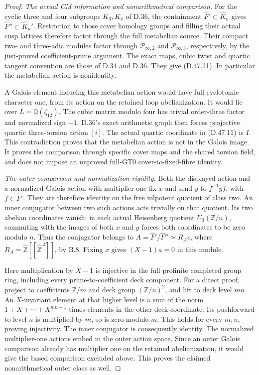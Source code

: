 \begin{proof}
\emph{The actual CM information and nonarithmetical comparison.}
For the cyclic
three and four
subgroups \(K_3,K_4\)
of D.36, the
containment
\(\widehat F'\subset
\widehat K_n\)
gives
\(\widehat F''\subset
\widehat K_n'\).
Restriction to those
cover homology groups
and filling their
actual cusp lattices
therefore factor
through the full
metabelian source.
Their compact
two- and three-adic
modules factor
through
\(\mathcal P_{\infty,2}\)
and
\(\mathcal P_{\infty,3}\),
respectively, by
the just-proved
coefficient-prime
argument.
The exact maps,
cubic twist and
quartic tangent
convention are
those of D.34
and D.36. They
give (D.47.11).
In particular the
metabelian action
is nonidentity.

A Galois element
inducing this
metabelian action
would have full
cyclotomic character
one, from its
action on the
retained loop
abelianization.
It would lie
over
\(L=\mathbb Q(\zeta_{12})\).
The cubic matrix
modulo four has
trivial order-three
factor and
normalized sign
\(-1\).
D.36's exact
arithmetic graph
then forces
projective quartic
three-torsion
action \([i]\).
The actual
quartic coordinate
in (D.47.11)
is \(I\).
This contradiction
proves that the
metabelian action
is not in the
Galois image.
It proves the
comparison through
specific cover
maps and the
shared torsion
field, and does
not impose an
unproved full-GT0
cover-to-fixed-fibre
identity.

\emph{The outer comparison and normalization rigidity.}
Both the displayed
action and a
normalized Galois
action with multiplier
one fix \(x\) and
send \(y\) to
\(f^{-1}yf\), with
\(f\in\widehat F'\).
They are therefore
identity on the
free nilpotent
quotient of class
two. An inner
conjugator between
two such actions
acts trivially on
that quotient.
Its two abelian
coordinates vanish:
in each actual
Heisenberg quotient
\(U_3(\mathbb Z/n)\),
commuting with the
images of both
\(x\) and \(y\)
forces both coordinates
to be zero modulo
\(n\). Thus the
conjugator belongs
to
\(A=\widehat F'/\widehat F''
\simeq R_Ac\), where
\(R_A=\widehat{\mathbb Z}
[[\widehat{\mathbb Z}^{\,2}]]\),
by B.8. Fixing
\(x\) gives
\((X-1)a=0\)
in this module.

Here multiplication
by \(X-1\) is
injective in the
full profinite
completed group ring,
including every
prime-to-coefficient
deck component.
For a direct proof,
project to coefficients
\(\mathbb Z/m\) and
deck group
\((\mathbb Z/n)^2\),
and lift to deck
level \(mn\).
An \(X\)-invariant
element at that
higher level is
a sum of the
norm
\(1+X+\cdots+X^{mn-1}\)
times elements in
the other deck
coordinate. Its
pushforward to
level \(n\) is
multiplied by \(m\),
so is zero modulo
\(m\). This holds
for every \(m,n\),
proving injectivity.
The inner conjugator
is consequently
identity. The
normalized multiplier-one
actions embed in
the outer action
space. Since an
outer Galois comparison
already has multiplier
one on the retained
abelianization, it
would give the
based comparison
excluded above.
This proves the
claimed nonarithmetical
outer class as well.


\end{proof}
